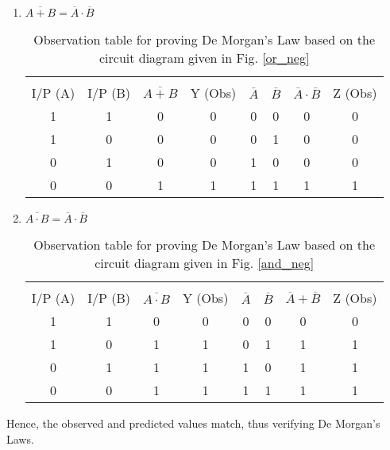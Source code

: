 \begin{enumerate}
    \item $\overline{A+B} = \overline{A} \cdot \overline {B}$\\
        \begin{table}[H]
            \centering
            \begin{tabular}{|c|c|c|c|c|c|c|c|}\hline
            & & & & & & &  \\
            I/P (A) & I/P (B) & $\overline{A+B}$ & Y (Obs) & $\overline{A}$ & $\overline{B}$ & $\overline{A} \cdot \overline {B}$ & Z (Obs)\\ \hline
            1&1 &0 &0 &0 &0 &0 &0  \\
            1&0 &0 &0 &0 &1 &0 &0  \\
            0&1 &0 &0 &1 &0 &0 &0  \\
            0&0 &1&1 &1 &1 &1 &1  \\\hline
            \end{tabular}
            \caption{Observation table for proving De Morgan's Law based on the circuit diagram given in Fig. \ref{or_neg}}
        \end{table}
    
    \newpage

    \item $\overline{A\cdot B} = \overline{A} \cdot \overline {B}$\\
        \begin{table}[H]
            \centering
            \begin{tabular}{|c|c|c|c|c|c|c|c|}\hline
            & & & & & & &  \\
            I/P (A) & I/P (B) & $\overline{A\cdot B}$ & Y (Obs) & $\overline{A}$ & $\overline{B}$ & $\overline{A} + \overline {B}$ & Z (Obs)\\ \hline
            1&1 &0 &0 &0 &0 &0 &0  \\
            1&0 &1 &1 &0 &1 &1 &1  \\
            0&1 &1 &1 &1 &0 &1 &1  \\
            0&0 &1 &1 &1 &1 &1 &1  \\\hline
            \end{tabular}
            \caption{Observation table for proving De Morgan's Law based on the circuit diagram given in Fig. \ref{and_neg}}
        \end{table}

\end{enumerate}
Hence, the observed and predicted values match, thus verifying De Morgan's Laws.